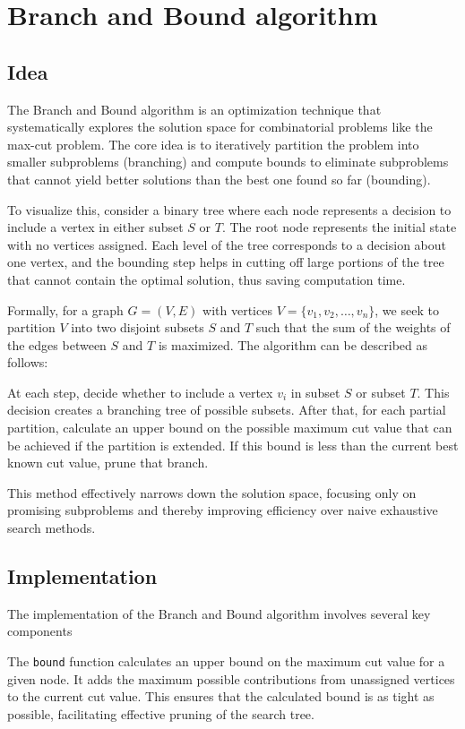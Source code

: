 \section{Branch and Bound algorithm}
\label{sec:branchandbound}

\subsection{Idea}
The Branch and Bound algorithm is an optimization technique that systematically explores the solution space for combinatorial problems like the max-cut problem. The core idea is to iteratively partition the problem into smaller subproblems (branching) and compute bounds to eliminate subproblems that cannot yield better solutions than the best one found so far (bounding).

To visualize this, consider a binary tree where each node represents a decision to include a vertex in either subset \(S\) or \(T\). The root node represents the initial state with no vertices assigned. Each level of the tree corresponds to a decision about one vertex, and the bounding step helps in cutting off large portions of the tree that cannot contain the optimal solution, thus saving computation time.

Formally, for a graph \(G = (V, E)\) with vertices \(V = \{v_1, v_2, \ldots, v_n\}\), we seek to partition \(V\) into two disjoint subsets \(S\) and \(T\) such that the sum of the weights of the edges between \(S\) and \(T\) is maximized. The algorithm can be described as follows:

At each step, decide whether to include a vertex \(v_i\) in subset \(S\) or subset \(T\). This decision creates a branching tree of possible subsets. After that, for each partial partition, calculate an upper bound on the possible maximum cut value that can be achieved if the partition is extended. If this bound is less than the current best known cut value, prune that branch.

This method effectively narrows down the solution space, focusing only on promising subproblems and thereby improving efficiency over naive exhaustive search methods.

\subsection{Implementation}
The implementation of the Branch and Bound algorithm involves several key components

The \texttt{bound} function calculates an upper bound on the maximum cut value for a given node. It adds the maximum possible contributions from unassigned vertices to the current cut value. This ensures that the calculated bound is as tight as possible, facilitating effective pruning of the search tree.

